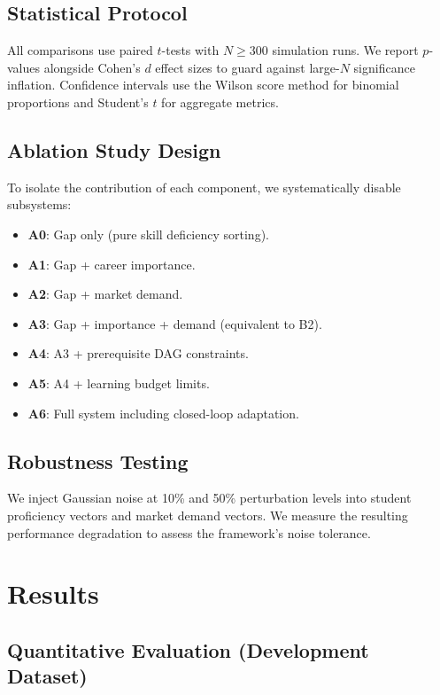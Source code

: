 \documentclass[conference]{IEEEtran}
\begin{document}
\subsection{Statistical Protocol}

All comparisons use paired $t$-tests with $N \geq 300$ simulation runs. We report $p$-values alongside Cohen's $d$ effect sizes to guard against large-$N$ significance inflation. Confidence intervals use the Wilson score method for binomial proportions and Student's $t$ for aggregate metrics.

\subsection{Ablation Study Design}

To isolate the contribution of each component, we systematically disable subsystems:

\begin{itemize}
    \item \textbf{A0}: Gap only (pure skill deficiency sorting).
    \item \textbf{A1}: Gap + career importance.
    \item \textbf{A2}: Gap + market demand.
    \item \textbf{A3}: Gap + importance + demand (equivalent to B2).
    \item \textbf{A4}: A3 + prerequisite DAG constraints.
    \item \textbf{A5}: A4 + learning budget limits.
    \item \textbf{A6}: Full system including closed-loop adaptation.
\end{itemize}

\subsection{Robustness Testing}

We inject Gaussian noise at 10\% and 50\% perturbation levels into student proficiency vectors and market demand vectors. We measure the resulting performance degradation to assess the framework's noise tolerance.

\section{Results}

\subsection{Quantitative Evaluation (Development Dataset)}
\end{document}
